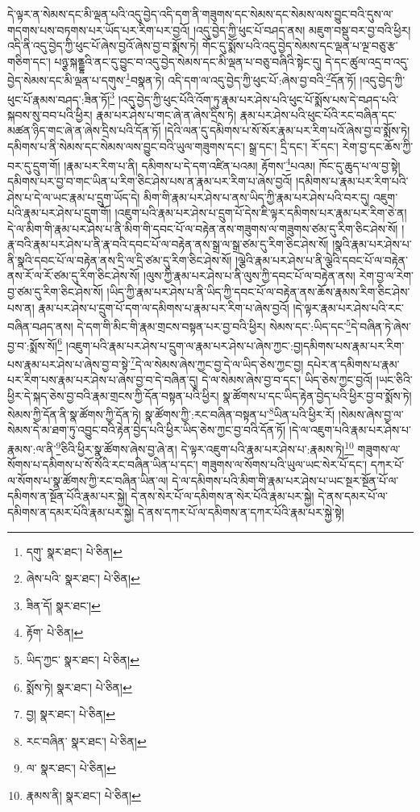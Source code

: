 དེ་ལྟར་ན་སེམས་དང་མི་ལྡན་པའི་འདུ་བྱེད་འདི་དག་ནི་གཟུགས་དང་སེམས་དང་སེམས་ལས་བྱུང་བའི་དུས་ལ་གདགས་པས་བཏགས་པར་ཡོད་པར་རིག་པར་བྱའོ། །འདུ་བྱེད་ཀྱི་ཕུང་པོ་བཤད་ནས། མཇུག་བསྡུ་བར་བྱ་བའི་ཕྱིར། འདི་ནི་འདུ་བྱེད་ཀྱི་ཕུང་པོ་ཞེས་བྱའོ་ཞེས་བྱ་བ་སྨོས་ཏེ། གོང་དུ་སྨོས་པའི་འདུ་བྱེད་སེམས་དང་ལྡན་པ་ལྔ་བཅུ་རྩ་གཅིག་དང་། པཉྩ་སྐནྡྷའི་ནང་དུ་བྱུང་བ་འདུ་བྱེད་སེམས་དང་མི་ལྡན་པ་བཅུ་བཞིའི་སྟེང་དུ། དེ་དང་ཚུལ་འདྲ་བ་འདུ་བྱེད་སེམས་དང་མི་ལྡན་པ་དགུས་\footnote{དགུ་  སྣར་ཐང་།  པེ་ཅིན། }བསྣན་ཏེ། འདི་དག་ལ་འདུ་བྱེད་ཀྱི་ཕུང་པོ་:ཞེས་བྱ་བའི་\footnote{ཞེས་པའི་  སྣར་ཐང་།  པེ་ཅིན། }དོན་ཏོ། །འདུ་བྱེད་ཀྱི་ཕུང་པོ་རྣམས་བཤད་:ཟིན་ཏོ།\footnote{ཟིན་དོ།  སྣར་ཐང་། } །འདུ་བྱེད་ཀྱི་ཕུང་པོའི་འོག་ཏུ་རྣམ་པར་ཤེས་པའི་ཕུང་པོ་སྨོས་པས་དེ་བཤད་པའི་སྐབས་སུ་བབ་པའི་ཕྱིར། རྣམ་པར་ཤེས་པ་གང་ཞེ་ན་ཞེས་དྲིས་ཏེ། རྣམ་པར་ཤེས་པའི་ཕུང་པོའི་རང་བཞིན་དང་མཚན་ཉིད་གང་ཞེ་ན་ཞེས་དྲིས་པའི་དོན་ཏོ། །དེའི་ལན་དུ་དམིགས་པ་སོ་སོར་རྣམ་པར་རིག་པའོ་ཞེས་བྱ་བ་སྨོས་ཏེ། དམིགས་པ་ནི་སེམས་དང་སེམས་ལས་བྱུང་བའི་ཡུལ་གཟུགས་དང་། སྒྲ་དང་། དྲི་དང་། རོ་དང་། རེག་བྱ་དང་ཆོས་ཀྱི་བར་དུ་དྲུག་གོ། །རྣམ་པར་རིག་པ་ནི། དམིགས་པ་དེ་དག་འཛིན་པའམ། རྟོགས་\footnote{རྟོག་  པེ་ཅིན། }པའམ། ཁོང་དུ་ཆུད་པ་ལ་བྱ་སྟེ། དམིགས་པར་བྱ་བ་གང་ཡིན་པ་རིག་ཅིང་ཤེས་པས་ན་རྣམ་པར་རིག་པ་ཞེས་བྱའོ། །དམིགས་པ་རྣམ་པར་རིག་པའི་ཤེས་པ་དེ་ལ་ཡང་རྣམ་པ་དྲུག་ཡོད་དེ། མིག་གི་རྣམ་པར་ཤེས་པ་ནས་ཡིད་ཀྱི་རྣམ་པར་ཤེས་པའི་བར་དུ། འཇུག་པའི་རྣམ་པར་ཤེས་པ་དྲུག་གོ། །འཇུག་པའི་རྣམ་པར་ཤེས་པ་དྲུག་པོ་དེས་ཇི་ལྟར་དམིགས་པར་རྣམ་པར་རིག་ཅེ་ན། དེ་ལ་མིག་གི་རྣམ་པར་ཤེས་པ་ནི་མིག་གི་དབང་པོ་ལ་བརྟེན་ནས་གཟུགས་ལ་གཟུགས་ཙམ་དུ་རིག་ཅིང་ཤེས་སོ། །རྣ་བའི་རྣམ་པར་ཤེས་པ་ནི་རྣ་བའི་དབང་པོ་ལ་བརྟེན་ནས་སྒྲ་ལ་སྒྲ་ཙམ་དུ་རིག་ཅིང་ཤེས་སོ། །སྣའི་རྣམ་པར་ཤེས་པ་ནི་སྣའི་དབང་པོ་ལ་བརྟེན་ནས་དྲི་ལ་དྲི་ཙམ་དུ་རིག་ཅིང་ཤེས་སོ། །ལྕེའི་རྣམ་པར་ཤེས་པ་ནི་ལྕེའི་དབང་པོ་ལ་བརྟེན་ནས་རོ་ལ་རོ་ཙམ་དུ་རིག་ཅིང་ཤེས་སོ། །ལུས་ཀྱི་རྣམ་པར་ཤེས་པ་ནི་ལུས་ཀྱི་དབང་པོ་ལ་བརྟེན་ནས། རེག་བྱ་ལ་རེག་བྱ་ཙམ་དུ་རིག་ཅིང་ཤེས་སོ། །ཡིད་ཀྱི་རྣམ་པར་ཤེས་པ་ནི་ཡིད་ཀྱི་དབང་པོ་ལ་བརྟེན་ནས་ཆོས་རྣམས་རིག་ཅིང་ཤེས་པས་ན། རྣམ་པར་ཤེས་པ་དྲུག་པོ་དག་ལ་དམིགས་པ་རྣམ་པར་རིག་པ་ཞེས་བྱའོ། །དེ་ལྟར་རྣམ་པར་ཤེས་པའི་རང་བཞིན་བཤད་ནས། དེ་དག་གི་མིང་གི་རྣམ་གྲངས་བསྟན་པར་བྱ་བའི་ཕྱིར། སེམས་དང་:ཡིད་དང་\footnote{ཡིད་ཀྱང་  སྣར་ཐང་།  པེ་ཅིན། }དེ་བཞིན་ཏེ་ཞེས་བྱ་བ་:སྨོས་སོ།\footnote{སྨོས་ཏེ།  སྣར་ཐང་།  པེ་ཅིན། } །འཇུག་པའི་རྣམ་པར་ཤེས་པ་དྲུག་ལ་རྣམ་པར་ཤེས་པ་ཞེས་ཀྱང་:བྱ།དམིགས་པས་རྣམ་པར་རིག་པས་རྣམ་པར་ཤེས་པ་ཞེས་བྱ་བ་སྟེ་\footnote{བྱ།  སྣར་ཐང་།  པེ་ཅིན། }དེ་ལ་སེམས་ཞེས་ཀྱང་བྱ་དེ་ལ་ཡིད་ཅེས་ཀྱང་བྱ། དཔེར་ན་དམིགས་པ་རྣམ་པར་རིག་པས་རྣམ་པར་ཤེས་པ་ཞེས་བྱ་བ་དེ་བཞིན་དུ། དེ་ལ་སེམས་ཞེས་བྱ་བ་དང་། ཡིད་ཅེས་ཀྱང་བྱའོ། །ཡང་ཅིའི་ཕྱིར་དེ་སྐད་ཅེས་བྱ་བའི་རྣམ་གྲངས་ཀྱི་དོན་བསྟན་པའི་ཕྱིར། སྣ་ཚོགས་པ་དང་ཡིད་རྟེན་བྱེད་པའི་ཕྱིར་བྱ་བ་སྨོས་ཏེ། སེམས་ཀྱི་དོན་ནི་སྣ་ཚོགས་ཀྱི་དོན་ཏེ། སྣ་ཚོགས་ཀྱི་:རང་བཞིན་བསྟན་པ་\footnote{རང་བཞིན་  སྣར་ཐང་།  པེ་ཅིན། }ཡིན་པའི་ཕྱིར་རོ། །སེམས་ཞེས་བྱ་ལ་སེམས་དེ་མ་ཐག་ཏུ་འབྱུང་བའི་རྟེན་བྱེད་པའི་ཕྱིར་ཡིད་ཅེས་ཀྱང་བྱ་བའི་དོན་ཏོ། །དེ་ལ་འཇུག་པའི་རྣམ་པར་ཤེས་པ་རྣམས་:ལ་ནི་\footnote{ལ་  སྣར་ཐང་།  པེ་ཅིན། }ཅིའི་ཕྱིར་སྣ་ཚོགས་ཞེས་བྱ་ཞེ་ན། དེ་ལྟར་འཇུག་པའི་རྣམ་པར་ཤེས་པ་:རྣམས་ཏེ།\footnote{རྣམས་ནི།  སྣར་ཐང་།  པེ་ཅིན། } གཟུགས་ལ་སོགས་པ་དམིགས་པ་སོ་སོའི་རང་བཞིན་ཡིན་པ་དང་། གཟུགས་ལ་སོགས་པའི་ཡུལ་ཡང་སེར་པོ་དང་། དཀར་པོ་ལ་སོགས་པ་སྣ་ཚོགས་ཀྱི་རང་བཞིན་ཡིན་ལ། དེ་ལ་དམིགས་པའི་མིག་གི་རྣམ་པར་ཤེས་པ་ཡང་སྔར་སྔོན་པོ་ལ་དམིགས་ན་སྔོན་པོའི་རྣམ་པར་སྐྱེ། དེ་ནས་སེར་པོ་ལ་དམིགས་ན་སེར་པོའི་རྣམ་པར་སྐྱེ། དེ་ནས་དམར་པོ་ལ་དམིགས་ན་དམར་པོའི་རྣམ་པར་སྐྱེ། དེ་ནས་དཀར་པོ་ལ་དམིགས་ན་དཀར་པོའི་རྣམ་པར་སྐྱེ་སྟེ། 